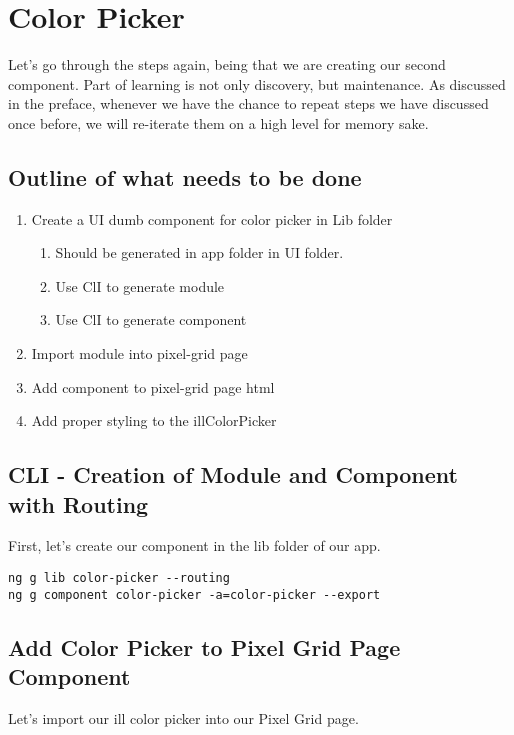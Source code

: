 \maketitle{}
\section{ Color Picker }

Let's go through the steps again, being that we are creating our second
component. Part of learning is not only discovery, but maintenance. As discussed
in the preface, whenever we have the chance to repeat steps we have discussed
once before, we will re-iterate them on a high level for memory sake.

\subsection{ Outline of what needs to be done }
\begin{enumerate}
  \item Create a UI dumb component for color picker in Lib folder
    \begin{enumerate}
      \item Should be generated in app folder in UI folder.
      \item Use ClI to generate module
      \item Use ClI to generate component
    \end{enumerate}
  \item Import module into pixel-grid page
  \item Add component to pixel-grid page html
  \item Add proper styling to the illColorPicker
\end{enumerate}

\subsection{ CLI - Creation of Module and Component with Routing }
First, let's create our component in the lib folder of our app.

\begin{lstlisting}
ng g lib color-picker --routing
ng g component color-picker -a=color-picker --export
\end{lstlisting}

\subsection{ Add Color Picker to Pixel Grid Page Component }
Let's import our ill color picker into our Pixel Grid page.

